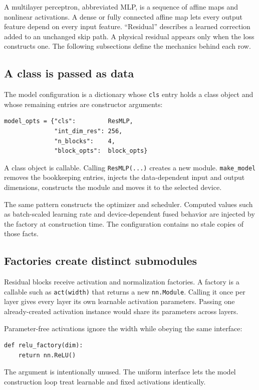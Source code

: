 \documentclass[10pt,aps,prd,twocolumn,nofootinbib]{revtex4-2}
\newcommand{\code}[1]{\texttt{#1}}
\begin{document}
A multilayer perceptron, abbreviated MLP, is a sequence of affine maps and
nonlinear activations.  A dense or fully connected affine map lets every
output feature depend on every input feature.  ``Residual'' describes a learned
correction added to an unchanged skip path.  A physical residual appears only
when the loss constructs one.  The following
subsections define the mechanics behind each row.

\subsection{A class is passed as data}

The model configuration is a dictionary whose \code{cls} entry holds a class
object and whose remaining entries are constructor arguments:
\begin{verbatim}
model_opts = {"cls":         ResMLP,
              "int_dim_res": 256,
              "n_blocks":    4,
              "block_opts":  block_opts}
\end{verbatim}
A class object is callable.  Calling \code{ResMLP(...)} creates a new module.
\code{make\_model} removes the bookkeeping entries, injects the data-dependent
input and output dimensions, constructs the module and moves it to the
selected device.

The same pattern constructs the optimizer and scheduler.  Computed values
such as batch-scaled learning rate and device-dependent fused behavior are
injected by the factory at construction time.  The configuration contains no
stale copies of those facts.

\subsection{Factories create distinct submodules}

Residual blocks receive activation and normalization factories.  A factory is
a callable such as \code{act(width)} that returns a new \code{nn.Module}.
Calling it once per layer gives every layer its own learnable activation
parameters.  Passing one already-created activation instance would share its
parameters across layers.

Parameter-free activations ignore the width while obeying the same interface:
\begin{verbatim}
def relu_factory(dim):
    return nn.ReLU()
\end{verbatim}
The argument is intentionally unused.  The uniform interface lets the model
construction loop treat learnable and fixed activations identically.
\end{document}
